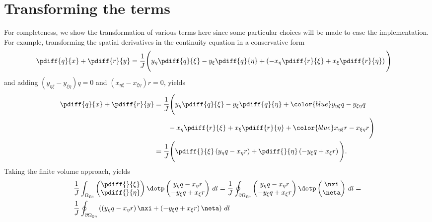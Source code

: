 \section{Transforming the terms}\label{sec:transforming_the_terms}
For completeness, we show the transformation of various terms here since some particular choices will be made to ease the implementation.
For example, transforming the spatial derivatives in the continuity equation in a conservative form
%
\begin{align}
	\pdiff{q}{x} + \pdiff{r}{y}  & = \frac{1}{J} \Bigg(  y_{\eta} \pdiff{q}{\xi}
    -y_{\xi}\pdiff{q}{\eta} +\left( - x_{\eta}\pdiff{r}{\xi}
    +x_{\xi}\pdiff{r}{\eta} \right) \Bigg)
\end{align}
and adding $(y_{\eta\xi} - y_{\xi\eta})q = 0$ and $(x_{\eta\xi} - x_{\xi\eta})r = 0$, yields
\begin{align}
    \pdiff{q}{x} + \pdiff{r}{y}
    & = \frac{1}{J} \Bigg(
    y_{\eta} \pdiff{q}{\xi}- y_{\xi}\pdiff{q}{\eta} + {\color{blue}y_{\eta\xi}q - y_{\xi\eta}q}
    \\
    & \qquad - x_{\eta}\pdiff{r}{\xi} + x_{\xi}\pdiff{r}{\eta} +{\color{blue}x_{\eta\xi}r - x_{\xi\eta}r} \Bigg)
    \\
    & =\frac{1}{J}\Bigg( \pdiff{}{\xi} \left( y_{\eta} q - x_{\eta} r \right) + \pdiff{}{\eta} \left( -y_{\xi} q + x_{\xi} r \right)\Bigg).
    \label{eq:full_curvilinear_mass_flux}
\end{align}
%
Taking the finite volume approach, yields
\begin{align}
&\frac{1}{J}\int_{\Omega_{\xi\eta}}
\begin{pmatrix}
    \pdiff{}{\xi} \\ \pdiff{}{\eta}
\end{pmatrix}
\dotp
\begin{pmatrix}
    y_{\eta} q - x_{\eta} r \\ -y_{\xi} q + x_{\xi} r
\end{pmatrix}
\, dl
=
\frac{1}{J}\oint_{\partial\Omega_{\xi\eta}}
\begin{pmatrix}
    y_{\eta} q - x_{\eta} r \\ -y_{\xi} q + x_{\xi} r
\end{pmatrix}
\dotp
\begin{pmatrix}
    \nxi \\ \neta
\end{pmatrix}
\, dl =
\\
&
\frac{1}{J}\oint_{\partial\Omega_{\xi\eta}} \left( \left( y_{\eta} q - x_{\eta} r \right)\nxi + \left( -y_{\xi} q + x_{\xi} r \right) \neta \right)\, dl
\label{eq:transformed_mass_flux}
\end{align}
%

